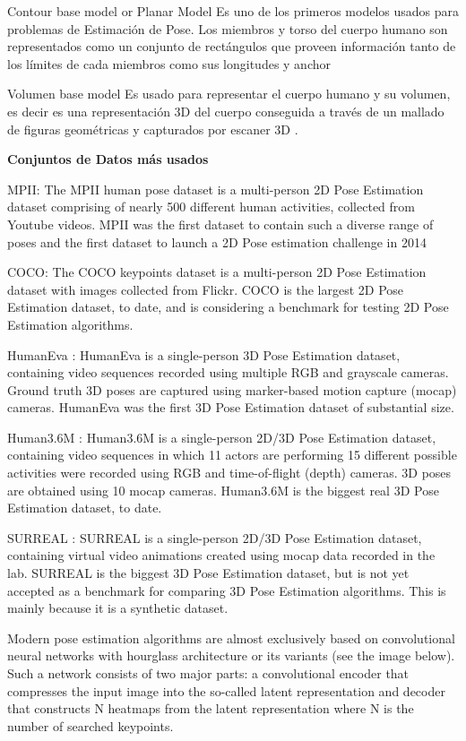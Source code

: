 Contour base model or Planar Model
Es uno de los primeros modelos usados para problemas de Estimación de Pose. Los miembros y torso del
cuerpo humano son representados como un conjunto de rectángulos que proveen información tanto de los
límites de cada miembros como sus longitudes y anchor \cite{557241} \cite{COOTES199538}

Volumen base model
Es usado para representar el cuerpo humano y su volumen, es decir es una representación 3D del
cuerpo conseguida a través de un mallado de figuras geométricas y capturados por escaner 3D
\cite{840661}.


\textbf{Conjuntos de Datos más usados}

MPII: The MPII human pose dataset is a multi-person 2D Pose Estimation dataset comprising of nearly
500 different human activities, collected from Youtube videos. MPII was the first dataset to contain
such a diverse range of poses and the first dataset to launch a 2D Pose estimation challenge in 2014

COCO: The COCO keypoints dataset is a multi-person 2D Pose Estimation dataset with images collected
from Flickr. COCO is the largest 2D Pose Estimation dataset, to date, and is considering a benchmark
for testing 2D Pose Estimation algorithms.

HumanEva : HumanEva is a single-person 3D Pose Estimation dataset, containing video sequences
recorded using multiple RGB and grayscale cameras. Ground truth 3D poses are captured using
marker-based motion capture (mocap) cameras. HumanEva was the first 3D Pose Estimation dataset of
substantial size.

Human3.6M : Human3.6M is a single-person 2D/3D Pose Estimation dataset, containing video sequences
in which 11 actors are performing 15 different possible activities were recorded using RGB and
time-of-flight (depth) cameras. 3D poses are obtained using 10 mocap cameras. Human3.6M is the
biggest real 3D Pose Estimation dataset, to date.

SURREAL : SURREAL is a single-person 2D/3D Pose Estimation dataset, containing virtual video
animations created using mocap data recorded in the lab. SURREAL is the biggest 3D Pose Estimation
dataset, but is not yet accepted as a benchmark for comparing 3D Pose Estimation algorithms. This
is mainly because it is a synthetic dataset.

Modern pose estimation algorithms are almost exclusively based on convolutional neural networks
with hourglass architecture or its variants (see the image below). Such a network consists of two
major parts: a convolutional encoder that compresses the input image into the so-called latent
representation and decoder that constructs N heatmaps from the latent representation where N is the
number of searched keypoints.

